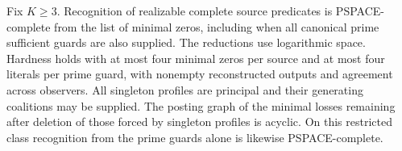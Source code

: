 \begin{theorem}
\label{core:thm:complete-guard-pspace}
Fix $K\ge3$. Recognition of realizable complete source predicates
is PSPACE-complete from the list of minimal zeros, including when
all canonical prime sufficient guards are also supplied. The reductions
use logarithmic space. Hardness holds with at most four minimal zeros
per source and at most four literals per prime guard, with nonempty
reconstructed outputs and agreement across observers. All singleton profiles
are principal and their generating coalitions may be supplied. The posting graph
of the minimal losses remaining after deletion of those forced by
singleton profiles is acyclic. On this restricted class recognition from
the prime guards alone is likewise PSPACE-complete.
\end{theorem}
